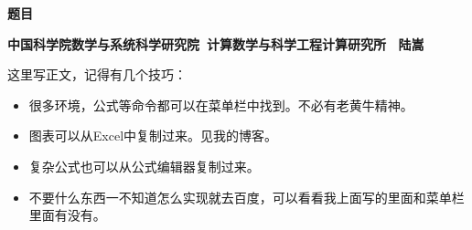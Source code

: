 \documentclass[a4paper]{ctexart} %
\author{陆嵩}
\begin{document}


\begin{center}\textbf{题目}\end{center}
\begin{center}\textbf{中国科学院数学与系统科学研究院\ 计算数学与科学工程计算研究所 \ 陆嵩}\end{center}
这里写正文，记得有几个技巧：
\begin{itemize}
  \item  很多环境，公式等命令都可以在菜单栏中找到。不必有老黄牛精神。
  \item  图表可以从Excel中复制过来。见我的博客。
  \item  复杂公式也可以从公式编辑器复制过来。
  \item  不要什么东西一不知道怎么实现就去百度，可以看看我上面写的里面和菜单栏里面有没有。
\end{itemize}
\end{document}
